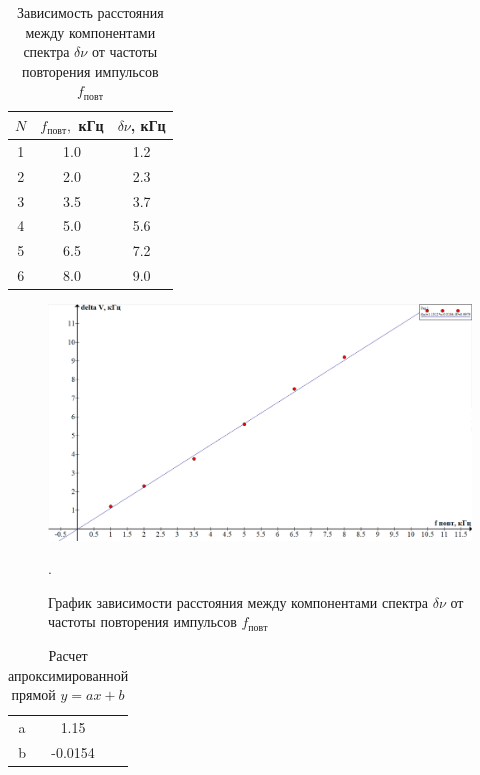   	\begin{table}[]
  		\caption{Зависимость расстояния между компонентами спектра $ \delta \nu $ от частоты повторения импульсов $ f_{повт} $}
  		\begin{center}
  			\begin{tabular}{|c|c|c|}
  				\hline
  				$ N $  & $ f_{повт}, $ кГц  & $ \delta \nu $, кГц \\
  				\hline
  				1 & 1.0 & 1.2 \\
  					\hline
  				2 & 2.0 & 2.3 \\
  					\hline
  				3 & 3.5 & 3.7 \\
  					\hline
  				4 & 5.0 & 5.6 \\
  					\hline
  				5 & 6.5 & 7.2 \\
  					\hline
  				6 & 8.0 & 9.0 \\
  				\hline
  			\end{tabular}
  		\end{center}
  		\label{B_table}
  	\end{table}
  	
  	\begin{figure}[h!]
  		\label{B_graf}
  		\includegraphics[scale=0.47]{pics/lab361_2.png}
  		\caption{График зависимости расстояния между компонентами спектра $ \delta \nu $ от частоты повторения импульсов $ f_{повт} $}. 
  	\end{figure}
  	
  	
  		\begin{table}[h!]
  		\centering
  		\caption{Расчет апроксимированной прямой $ y = ax +b $}
  		\begin{tabular}{c|cc}
  			\text{} & \text{Estimate} & \\
  			\hline
  			a & 1.15 & \\
  			b & -0.0154 &  \\
  			\hline
  		\end{tabular}
  	\end{table}
  	
